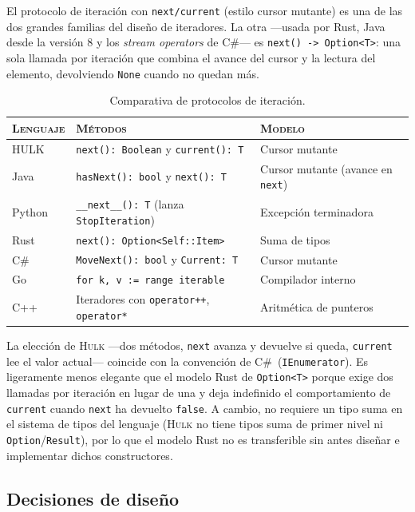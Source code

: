 \documentclass[11pt,a4paper,oneside,openany]{report}
\newcommand{\hulk}{\textsc{Hulk}}
\newcommand{\code}[1]{\texttt{#1}}
\begin{document}
El protocolo de iteración con \code{next/current} (estilo cursor mutante)
es una de las dos grandes familias del diseño de iteradores. La otra
---usada por Rust, Java desde la versión 8 y los \emph{stream operators}
de C\#--- es \code{next() -> Option<T>}: una sola llamada por iteración que
combina el avance del cursor y la lectura del elemento, devolviendo
\code{None} cuando no quedan más.

\begin{table}[H]
\centering
\caption{Comparativa de protocolos de iteración.}
\label{tab:iter-lang}
\begin{tabularx}{\textwidth}{lXX}
\toprule
\textsc{Lenguaje} & \textsc{Métodos} & \textsc{Modelo} \\
\midrule
HULK     & \code{next(): Boolean} y \code{current(): T}        & Cursor mutante \\
Java     & \code{hasNext(): bool} y \code{next(): T}            & Cursor mutante (avance en \code{next}) \\
Python   & \code{\_\_next\_\_(): T} (lanza \code{StopIteration}) & Excepción terminadora \\
Rust     & \code{next(): Option<Self::Item>}                  & Suma de tipos \\
C\#      & \code{MoveNext(): bool} y \code{Current: T}          & Cursor mutante \\
Go       & \code{for k, v := range iterable}                  & Compilador interno \\
C++      & Iteradores con \code{operator++}, \code{operator*}  & Aritmética de punteros \\
\bottomrule
\end{tabularx}
\end{table}

La elección de \hulk{} ---dos métodos, \code{next} avanza y devuelve si
queda, \code{current} lee el valor actual--- coincide con la convención de
C\#~(\code{IEnumerator}). Es ligeramente menos elegante que el modelo Rust
de \code{Option<T>} porque exige dos llamadas por iteración en lugar de
una y deja indefinido el comportamiento de \code{current} cuando
\code{next} ha devuelto \code{false}. A cambio, no requiere un tipo suma
en el sistema de tipos del lenguaje (\hulk{} no tiene tipos suma de primer
nivel ni \code{Option}/\code{Result}), por lo que el modelo Rust no es
transferible sin antes diseñar e implementar dichos constructores.

\subsection{Decisiones de diseño}
\end{document}
